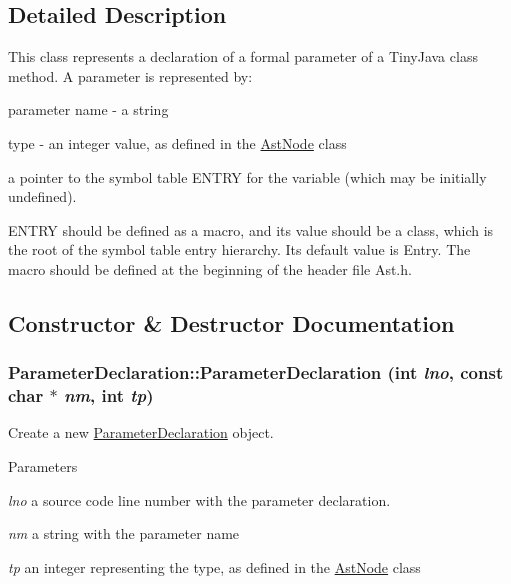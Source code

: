 \subsection{Detailed Description}
This class represents a declaration of a formal parameter of a TinyJava class method. A parameter is represented by:
\begin{DoxyItemize}
\item parameter name -\/ a string
\item type -\/ an integer value, as defined in the \hyperlink{classAstNode}{AstNode} class
\item a pointer to the symbol table ENTRY for the variable (which may be initially undefined).
\end{DoxyItemize}

ENTRY should be defined as a macro, and its value should be a class, which is the root of the symbol table entry hierarchy. Its default value is Entry. The macro should be defined at the beginning of the header file Ast.h. 

\subsection{Constructor \& Destructor Documentation}
\hypertarget{classParameterDeclaration_ac1212fec82bbbcb3d965f6b21ba0f814}{
\subsubsection[{ParameterDeclaration}]{\setlength{\rightskip}{0pt plus 5cm}ParameterDeclaration::ParameterDeclaration (int {\em lno}, \/  const char $\ast$ {\em nm}, \/  int {\em tp})}}
\label{classParameterDeclaration_ac1212fec82bbbcb3d965f6b21ba0f814}
Create a new \hyperlink{classParameterDeclaration}{ParameterDeclaration} object.


\begin{DoxyParams}{Parameters}
\item[{\em lno}]a source code line number with the parameter declaration. \item[{\em nm}]a string with the parameter name \item[{\em tp}]an integer representing the type, as defined in the \hyperlink{classAstNode}{AstNode} class \end{DoxyParams}

